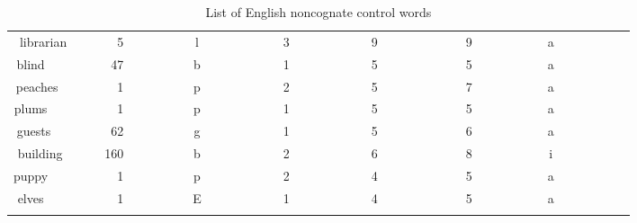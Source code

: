 \begin{longtable}{|c|c|c|c|c|c|c|}
librarian~~~&~~5~~~~~~~~~&l~~~~~~~~~~~&3~~~~~~~~~~~&9~~~~~~~~~~~&~9~~~~~~~~~~&a~~~~~~~~~~~\\ 
blind~~~~~~~&~47~~~~~~~~~&b~~~~~~~~~~~&1~~~~~~~~~~~&5~~~~~~~~~~~&~5~~~~~~~~~~&a~~~~~~~~~~~\\ 
peaches~~~~~&~~1~~~~~~~~~&p~~~~~~~~~~~&2~~~~~~~~~~~&5~~~~~~~~~~~&~7~~~~~~~~~~&a~~~~~~~~~~~\\ 
plums~~~~~~~&~~1~~~~~~~~~&p~~~~~~~~~~~&1~~~~~~~~~~~&5~~~~~~~~~~~&~5~~~~~~~~~~&a~~~~~~~~~~~\\ 
guests~~~~~~&~62~~~~~~~~~&g~~~~~~~~~~~&1~~~~~~~~~~~&5~~~~~~~~~~~&~6~~~~~~~~~~&a~~~~~~~~~~~\\ 
building~~~~&160~~~~~~~~~&b~~~~~~~~~~~&2~~~~~~~~~~~&6~~~~~~~~~~~&~8~~~~~~~~~~&i~~~~~~~~~~~\\ 
puppy~~~~~~~&~~1~~~~~~~~~&p~~~~~~~~~~~&2~~~~~~~~~~~&4~~~~~~~~~~~&~5~~~~~~~~~~&a~~~~~~~~~~~\\ 
elves~~~~~~~&~~1~~~~~~~~~&E~~~~~~~~~~~&1~~~~~~~~~~~&4~~~~~~~~~~~&~5~~~~~~~~~~&a~~~~~~~~~~~\\ 
\hline
\caption{List of English noncognate control words}\label{eng_controls}
\end{longtable}
